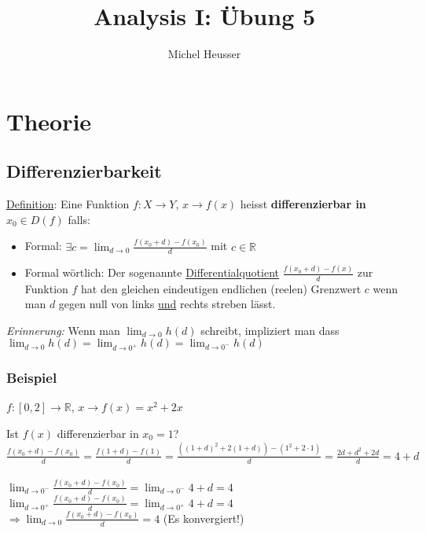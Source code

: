 \documentclass[11pt]{article} %
\title{Analysis I: Übung 5}
\author{Michel Heusser}
\begin{document}
\maketitle

\section{Theorie}

\subsection{Differenzierbarkeit}


\underline{Definition}: Eine Funktion $f: X \rightarrow Y$, $x \rightarrow f(x)$ heisst {\bf differenzierbar in $x_0 \in D(f)$} falls:
\begin{itemize}  
\item Formal: $\exists c = \lim_{d \rightarrow 0} \frac{f(x_0+d)-f(x_0)}{d}$ mit $c\in \mathbb{R}$
\item Formal wörtlich: Der sogenannte \underline{Differentialquotient} $\frac{f(x_0+d)-f(x)}{d}$ zur Funktion $f$ hat den gleichen eindeutigen endlichen (reelen) Grenzwert $c$ wenn man $d$ gegen null von links \underline{und} rechts streben lässt.
\end{itemize}


\emph{Erinnerung:} Wenn man $\lim_{d \rightarrow 0} h(d) $ schreibt, impliziert man dass  $\lim_{d \rightarrow 0} h(d) = \lim_{d \rightarrow 0^+} h(d) = \lim_{d \rightarrow 0^-} h(d)$\\

\subsubsection{Beispiel}

$f: [0,2] \rightarrow \mathbb{R}$, $x \rightarrow f(x) = x^2 + 2x $

Ist $f(x)$ differenzierbar in $x_0 =1$?\\

$ \frac{f(x_0+d)-f(x_0)}{d} = \frac{f(1+d)-f(1)}{d} = \frac{((1+d)^2+2(1+d))-(1^2 + 2\cdot 1)}{d}=\frac{2d+d^2+2d}{d}=  4+d $\\\\
$ \lim_{d \rightarrow 0^-} \frac{f(x_0+d)-f(x_0)}{d} =  \lim_{d \rightarrow 0^-} 4+d = 4 $\\
$ \lim_{d \rightarrow 0^+} \frac{f(x_0+d)-f(x_0)}{d} =  \lim_{d \rightarrow 0^+} 4+d = 4 $\\
$\Rightarrow \lim_{d \rightarrow 0} \frac{f(x_0+d)-f(x_0)}{d} =4 $ (Es konvergiert!)
\end{document}
